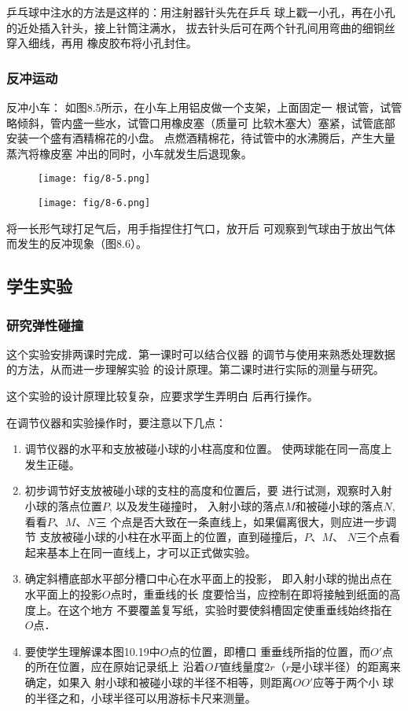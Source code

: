 乒乓球中注水的方法是这样的：用注射器针头先在乒乓
球上戳一小孔，再在小孔的近处插入针头，接上针筒注满水，
拔去针头后可在两个针孔间用弯曲的细铜丝穿入细线，再用
橡皮胶布将小孔封住。

\subsubsection{反冲运动}
反冲小车：
如图8.5所示，在小车上用铝皮做一个支架，上面固定一
根试管，试管略倾斜，管内盛一些水，试管口用橡皮塞（质量可
比软木塞大）塞紧，试管底部安装一个盛有酒精棉花的小盘。
点燃酒精棉花，待试管中的水沸腾后，产生大量蒸汽将橡皮塞
冲出的同时，小车就发生后退现象。

\begin{figure}[htp]\centering
    \begin{minipage}[t]{0.48\textwidth}
    \centering
\texttt{[image: fig/8-5.png]}
    \caption{}
    \end{minipage}
    \begin{minipage}[t]{0.48\textwidth}
    \centering
\texttt{[image: fig/8-6.png]}
    \caption{}
    \end{minipage}
    \end{figure}

将一长形气球打足气后，用手指捏住打气口，放开后
可观察到气球由于放出气体而发生的反冲现象（图8.6）。

\subsection{学生实验}
\subsubsection{研究弹性碰撞}
这个实验安排两课时完成．第一课时可以结合仪器
的调节与使用来熟悉处理数据的方法，从而进一步理解实验
的设计原理。第二课时进行实际的测量与研究。

这个实验的设计原理比较复杂，应要求学生弄明白
后再行操作。

在调节仪器和实验操作时，要注意以下几点：
\begin{enumerate}
    \item 调节仪器的水平和支放被碰小球的小柱高度和位置。
使两球能在同一高度上发生正碰。
\item 初步调节好支放被碰小球的支柱的高度和位置后，要
进行试测，观察时入射小球的落点位置$P$, 以及发生碰撞时，
入射小球的落点$M$和被碰小球的落点$N$, 看看$P$、$M$、$N$三
个点是否大致在一条直线上，如果偏离很大，则应进一步调节
支放被碰小球的小柱在水平面上的位置，直到碰撞后，$P$、$M$、
$N$三个点看起来基本上在同一直线上，才可以正式做实验。
\item 确定斜槽底部水平部分槽口中心在水平面上的投影，
即入射小球的抛出点在水平面上的投影$O$点时，重垂线的长
度要恰当，应控制在即将接触到纸面的高度上。在这个地方
不要覆盖复写纸，实验时要使斜槽固定使重垂线始终指在
$O$点．
\item 要使学生理解课本图10.19中$O$点的位置，即槽口
重垂线所指的位置，而$O'$点的所在位置，应在原始记录纸上
沿着$OP$直线量度$2r$（$r$是小球半径）的距离来确定，如果入
射小球和被碰小球的半径不相等，则距离$OO'$应等于两个小
球的半径之和，小球半径可以用游标卡尺来测量。
\end{enumerate}

